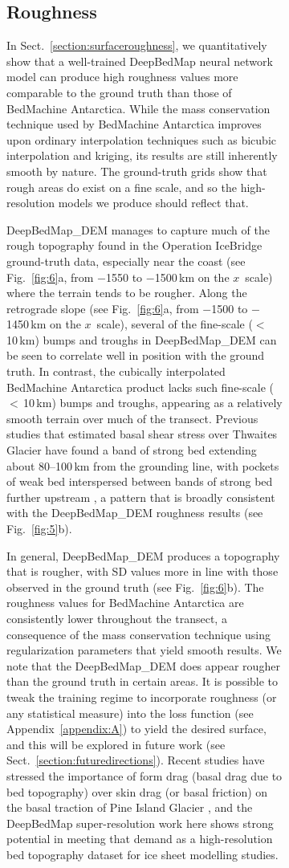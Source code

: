 \documentclass[tc, noline]{copernicus}
\begin{document}
\begin{figure}[t]
\begin{figure}[t]
\subsection{Roughness}

In Sect.~\ref{section:surfaceroughness}, we quantitatively show that a well-trained DeepBedMap neural network model can produce high roughness values more comparable to the ground truth than those of BedMachine Antarctica.
While the mass conservation technique used by BedMachine Antarctica \citep{MorlighemDeepglacialtroughs2019} improves upon ordinary interpolation techniques such as bicubic interpolation and kriging, its results are still inherently smooth by nature.
The ground-truth grids show that rough areas do exist on a fine scale, and so the high-resolution models we produce should reflect that.

DeepBedMap\_DEM manages to capture much of the rough topography found in the Operation IceBridge ground-truth data, especially near the coast (see Fig.~\ref{fig:6}a, from $-$1550 to $-$1500\,\unit{km} on the $x$~scale) where the terrain tends to be rougher.
Along the retrograde slope (see Fig.~\ref{fig:6}a, from $-$1500 to $-$1450\,\unit{km} on the $x$~scale), several of the fine-scale ($<$\,10\,\unit{km}) bumps and troughs in DeepBedMap\_DEM can be seen to correlate well in position with the ground truth.
In contrast, the cubically interpolated BedMachine Antarctica product lacks such fine-scale ($<$\,10\,\unit{km}) bumps and troughs, appearing as a relatively smooth terrain over much of the transect.
Previous studies that estimated basal shear stress over Thwaites Glacier have found a band of strong bed extending about 80--100\,\unit{km} from the grounding line, with pockets of weak bed interspersed between bands of strong bed further upstream \citep{JoughinBasalconditionsPine2009,SergienkoRegularPatternsFrictional2013}, a pattern that is broadly consistent with the DeepBedMap\_DEM roughness results (see Fig.~\ref{fig:5}b).

In general, DeepBedMap\_DEM produces a topography that is rougher, with SD values more in line with those observed in the ground truth (see Fig.~\ref{fig:6}b).
The roughness values for BedMachine Antarctica are consistently lower throughout the transect, a consequence of the mass conservation technique using regularization parameters that yield smooth results.
We note that the DeepBedMap\_DEM does appear rougher than the ground truth in certain areas.
It is possible to tweak the training regime to incorporate roughness (or any statistical measure) into the loss function (see Appendix~\ref{appendix:A}) to yield the desired surface, and this will be explored in future work (see Sect.~\ref{section:futuredirections}).
Recent studies have stressed the importance of form drag (basal drag due to bed topography) over skin drag (or basal friction) on the basal traction of Pine Island Glacier \citep{BinghamDiverselandscapesPine2017,Kyrke-SmithRelevanceDetailBasal2018}, and the DeepBedMap super-resolution work here shows strong potential in meeting that demand as a high-resolution bed topography dataset for ice sheet modelling studies.


\end{figure}
\end{figure}
\end{document}
